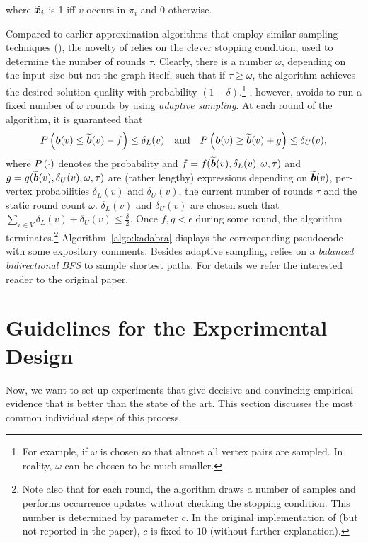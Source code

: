 \documentclass[algorithms,article,submit,moreauthors,pdftex]{Definitions/mdpi}
\newcommand{\changed}[1]{#1}
\newcommand{\removed}[1]{}
\begin{document}
where ${\widetilde{\bm{x}}}_i$ is 1 iff $v$ occurs in $\pi_i$ and 0 otherwise.

Compared to earlier approximation algorithms that employ
similar sampling techniques (\eg \cite{riondato2016fast}),
the novelty of \kad relies on the clever stopping condition, used to determine
the number of rounds $\tau$. Clearly, there is a number $\omega$,
depending on the input size but not the graph itself,
such that if $\tau \geq \omega$, the algorithm achieves the desired solution quality
with probability $(1 - \delta)$.\footnote{For example,
	if $\omega$ is chosen so that almost all vertex pairs are sampled.
	In reality, $\omega$ can be chosen to be much smaller. \removed{than that.}}
\kad, however, avoids to run a fixed number of $\omega$ rounds by using
\emph{adaptive sampling}. At each round of the algorithm, it is guaranteed that
%
\begin{equation}
  {P}\left({\bm{b}}(v) \le {\ensuremath{\widetilde{\bm{b}}}}(v) - f\right) \le \delta_L(v)
  \quad \textnormal{and} \quad
  {P}\left({\bm{b}}(v) \ge {\ensuremath{\widetilde{\bm{b}}}}(v) + g\right) \le \delta_U(v),
\end{equation}
%
where \changed{${P}\left(\cdot\right)$ denotes the probability and} $f = f({\widetilde{\bm{b}}}(v), \delta_L(v), \omega, \tau)$
and $g = g({\widetilde{\bm{b}}}(v), \delta_U(v), \omega, \tau)$
are (rather lengthy) expressions depending on
${\widetilde{\bm{b}}}(v)$, per-vertex probabilities
$\delta_L(v)$ and $\delta_U(v)$,
the current number of rounds $\tau$ and the static round count
$\omega$.
$\delta_L(v)$ and $\delta_U(v)$ are chosen such that
$\sum_{v \in V} \delta_L(v) + \delta_U(v) \leq \frac\delta2$.
Once $f, g < \epsilon$ during some round,
the algorithm terminates.\footnote{
Note also that for each round,
  the algorithm draws a number of samples and performs occurrence updates
  without checking the stopping condition.
  This number is determined by parameter $c$. In the original
  implementation of \kad (but not reported in the paper), $c$ is fixed to $10$ (without further explanation).}
Algorithm~\ref{algo:kadabra} displays the corresponding pseudocode with some
expository comments.
%
Besides adaptive sampling, \kad
relies on a \emph{balanced bidirectional BFS} to sample shortest paths.
For details we refer the interested reader to the original paper.

\section{Guidelines for the Experimental Design}
%
Now, we want to set up experiments that give decisive and convincing empirical evidence \changed{that} \kad is better than the state of the art.
This section discusses the most common individual steps of this process.
\end{document}
